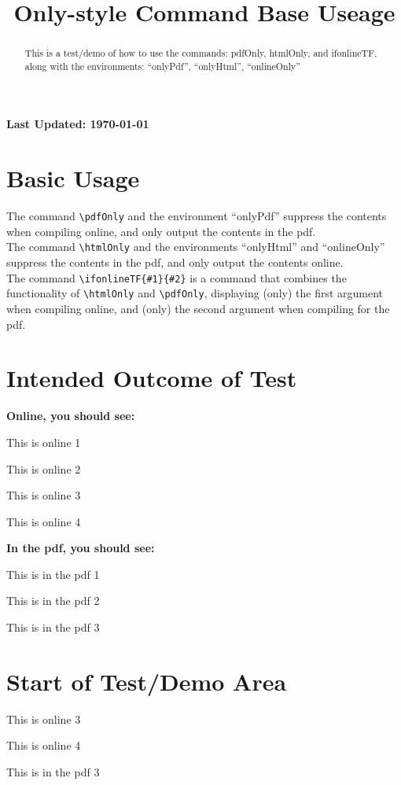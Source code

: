 \documentclass{ximera}
\title{Only-style Command Base Useage}
\begin{document}
\begin{abstract}
    This is a test/demo of how to use the commands: pdfOnly, htmlOnly, and ifonlineTF, along with 
    the environments: ``onlyPdf'', ``onlyHtml'', ``onlineOnly''
\end{abstract}
\maketitle

{{\Huge \bfseries Last Updated: \today}} \\


\section{Basic Usage}
The command \verb|\pdfOnly| and the environment ``onlyPdf'' suppress the contents when compiling online, and only output the contents in the pdf.\\

The command \verb|\htmlOnly| and the environments ``onlyHtml'' and ``onlineOnly'' suppress the contents in the pdf, and only output the contents online.\\

The command \verb|\ifonlineTF{#1}{#2}| is a command that combines the functionality of \verb|\htmlOnly| and \verb|\pdfOnly|,
displaying (only) the first argument when compiling online, and (only) the second argument when compiling for the pdf.


\section{Intended Outcome of Test}

{{\bfseries Online, you should see:}}

This is online 1

This is online 2

This is online 3

This is online 4

{{\bfseries In the pdf, you should see:}}

This is in the pdf 1

This is in the pdf 2

This is in the pdf 3


\section{Start of Test/Demo Area}



\begin{onlineOnly}
    This is online 3
\end{onlineOnly}

\begin{onlyHtml}
    This is online 4
\end{onlyHtml}

\begin{onlyPdf}
    This is in the pdf 3
\end{onlyPdf}


\hrulefill
\end{document}
